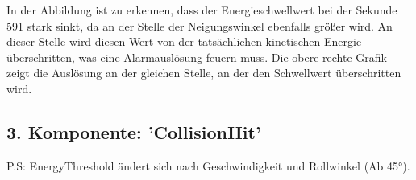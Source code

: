 In der Abbildung ist zu erkennen, dass der Energieschwellwert bei der Sekunde 591 stark sinkt, da an der Stelle der Neigungswinkel ebenfalls größer wird.
An dieser Stelle wird diesen Wert von der tatsächlichen kinetischen Energie überschritten, was eine Alarmauslösung feuern muss. Die obere rechte Grafik zeigt die Auslösung an der gleichen Stelle, an der den Schwellwert überschritten wird.





\subsection{3. Komponente: 'CollisionHit'} %
P.S: EnergyThreshold ändert sich nach Geschwindigkeit und Rollwinkel (Ab \ang{45}).\\

